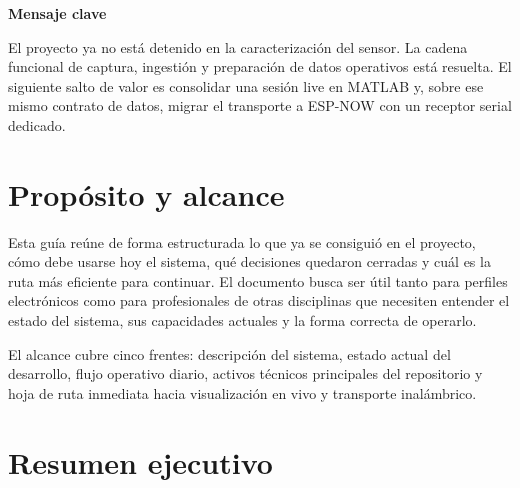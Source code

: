 \documentclass[11pt,a4paper]{article}
\begin{document}
\begin{titlepage}
\vfill

\begin{infobox}
\textbf{Mensaje clave}\par
El proyecto ya no está detenido en la caracterización del sensor. La cadena funcional de captura, ingestión y preparación de datos operativos está resuelta. El siguiente salto de valor es consolidar una sesión live en MATLAB y, sobre ese mismo contrato de datos, migrar el transporte a ESP-NOW con un receptor serial dedicado.
\end{infobox}

\vspace{0.8cm}
\colorbox{Primary}{\parbox{\dimexpr\textwidth-2\fboxsep\relax}{\vspace{0.35cm}\hfill}}
\end{titlepage}
\clearpage
\hypersetup{pageanchor=true}
\setcounter{page}{1}

\tableofcontents
\newpage

\section{Propósito y alcance}

Esta guía reúne de forma estructurada lo que ya se consiguió en el proyecto, cómo debe usarse hoy el sistema, qué decisiones quedaron cerradas y cuál es la ruta más eficiente para continuar. El documento busca ser útil tanto para perfiles electrónicos como para profesionales de otras disciplinas que necesiten entender el estado del sistema, sus capacidades actuales y la forma correcta de operarlo.

El alcance cubre cinco frentes: descripción del sistema, estado actual del desarrollo, flujo operativo diario, activos técnicos principales del repositorio y hoja de ruta inmediata hacia visualización en vivo y transporte inalámbrico.

\section{Resumen ejecutivo}
\end{document}

